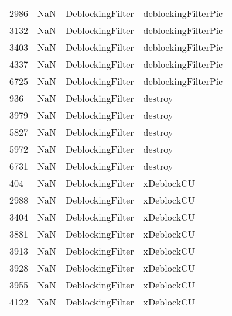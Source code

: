 \begin{tabular}{llll}
2986 &                   NaN &           DeblockingFilter &                       deblockingFilterPic \\
3132 &                   NaN &           DeblockingFilter &                       deblockingFilterPic \\
3403 &                   NaN &           DeblockingFilter &                       deblockingFilterPic \\
4337 &                   NaN &           DeblockingFilter &                       deblockingFilterPic \\
6725 &                   NaN &           DeblockingFilter &                       deblockingFilterPic \\
936  &                   NaN &           DeblockingFilter &                                   destroy \\
3979 &                   NaN &           DeblockingFilter &                                   destroy \\
5827 &                   NaN &           DeblockingFilter &                                   destroy \\
5972 &                   NaN &           DeblockingFilter &                                   destroy \\
6731 &                   NaN &           DeblockingFilter &                                   destroy \\
404  &                   NaN &           DeblockingFilter &                                xDeblockCU \\
2988 &                   NaN &           DeblockingFilter &                                xDeblockCU \\
3404 &                   NaN &           DeblockingFilter &                                xDeblockCU \\
3881 &                   NaN &           DeblockingFilter &                                xDeblockCU \\
3913 &                   NaN &           DeblockingFilter &                                xDeblockCU \\
3928 &                   NaN &           DeblockingFilter &                                xDeblockCU \\
3955 &                   NaN &           DeblockingFilter &                                xDeblockCU \\
4122 &                   NaN &           DeblockingFilter &                                xDeblockCU \\

\end{tabular}
